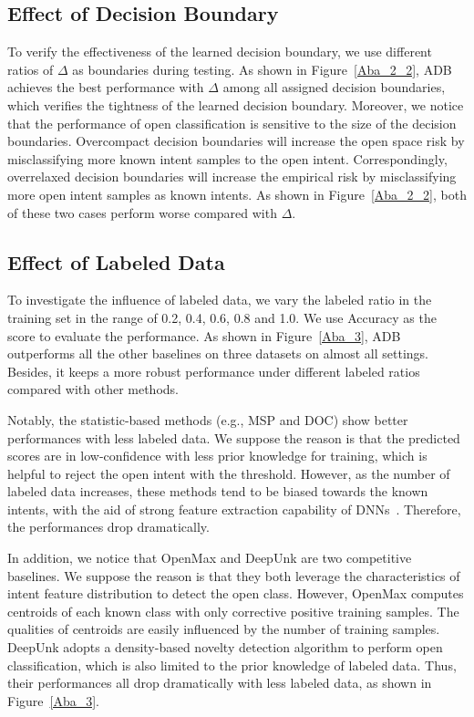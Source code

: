 \documentclass[letterpaper]{article} %
\begin{document}
\subsection{Effect of Decision Boundary}
To verify the effectiveness of the learned decision boundary, we use different ratios of $\Delta$ as boundaries during testing. As shown in Figure~\ref{Aba_2_2}, ADB achieves the best performance with $\Delta$ among all assigned decision boundaries, which verifies the tightness of the learned decision boundary. Moreover, we notice that the performance of open classification is sensitive to the size of the decision boundaries. Overcompact decision boundaries will increase the open space risk by misclassifying more known intent samples to the open intent. Correspondingly, overrelaxed decision boundaries will increase the empirical risk by misclassifying more open intent samples as known intents. As shown in Figure~\ref{Aba_2_2}, both of these two cases perform worse compared with $\Delta$.

\subsection{Effect of Labeled Data}
To investigate the influence of labeled data, we vary the labeled ratio in the training set in the range of 0.2, 0.4, 0.6, 0.8 and 1.0. We use Accuracy as the score to evaluate the performance. As shown in Figure~\ref{Aba_3}, ADB outperforms all the other baselines on three datasets on almost all settings. Besides, it keeps a more robust performance under different labeled ratios compared with other methods.

Notably, the statistic-based methods (e.g., MSP and DOC) show better performances with less labeled data. We suppose the reason is that the predicted scores are in low-confidence with less prior knowledge for training, which is helpful to reject the open intent with the threshold. However, as the number of labeled data increases, these methods tend to be biased towards the known intents, with the aid of strong feature extraction capability of DNNs~\cite{7298640}. Therefore, the performances drop dramatically.


In addition, we notice that OpenMax and DeepUnk are two competitive baselines. We suppose the reason is that they both leverage the characteristics of intent feature distribution to detect the open class. However, OpenMax computes centroids of each known class with only corrective positive training samples. The qualities of centroids are easily influenced by the number of training samples. DeepUnk adopts a density-based novelty detection algorithm to perform open classification, which is also limited to the prior knowledge of labeled data. Thus, their performances all drop dramatically with less labeled data, as shown in Figure~\ref{Aba_3}.
\end{document}
